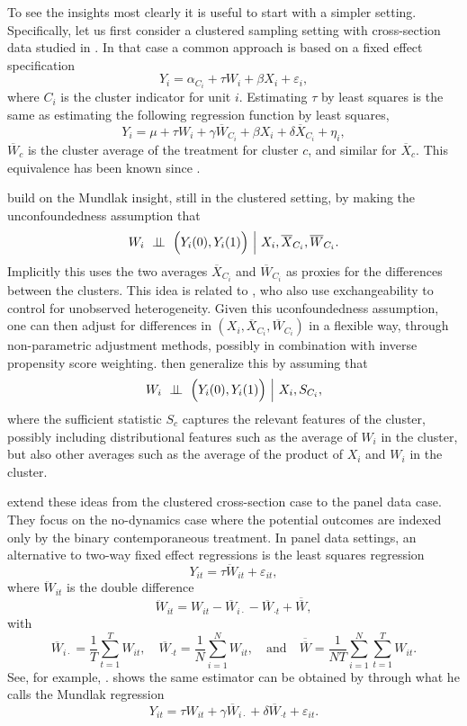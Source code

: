 \documentclass[letterpaper,12pt,leqno]{article}
\newcommand{\indep}{\perp\!\!\!\perp}
\begin{document}
To see the insights most clearly it is useful to start with a simpler setting. Specifically, let us first consider a clustered sampling setting with cross-section data studied in \citep*{arkhangelsky2018role}. In that case a common approach is based on a fixed effect specification
\[ Y_i=\alpha_{C_i}+\tau W_i+\beta X_i+\varepsilon_i,\]
where $C_i$ is the cluster indicator for unit $i$.
Estimating $\tau$ by least squares is the same as estimating the following regression function by least squares,
\[ Y_i=\mu+\tau W_i+\gamma \overline{W}_{C_i}+\beta X_i+\delta \overline{X}_{C_i}+\eta_i,\]
 $\overline{W}_c$ is the cluster average of the treatment for cluster $c$, and similar for $\overline{X}_c$. This equivalence has been known since \citep*{mundlak1978pooling}.




\citep*{arkhangelsky2018role} build on the Mundlak insight, still in the clustered setting, by making the unconfoundedness assumption that 
\[ W_i\ \indep\ \Bigl(Y_i(0),Y_i(1)\Bigr)\ \Bigl|\ X_i,\overline{X}_{C_i},\overline{W}_{C_i}.\]
Implicitly this uses the two averages $\overline{X}_{C_i}$ and $\overline{W}_{C_i}$ as proxies for the differences between the clusters. This idea is related to \citep{altonji2005cross}, who also use exchangeability to control for unobserved heterogeneity. 
Given this uconfoundedness assumption, one can then adjust for differences in  $( X_i,\overline{X}_{C_i},\overline{W}_{C_i})$ in a flexible way, through non-parametric adjustment methods, possibly in combination with inverse propensity score weighting. 
\citep*{arkhangelsky2018role} then generalize this by assuming that 
\[ W_i\ \indep\ \Bigl(Y_i(0),Y_i(1)\Bigr)\ \Bigl|\ X_i,S_{C_i},\]
where the sufficient statistic $S_c$ captures the relevant features of the cluster, possibly including distributional features such as the average of $W_i$ in the cluster, but also other averages such as the average of the product of $X_i$ and $W_i$ in the cluster.

\citep*{arkhangelsky2022doubly} extend these ideas from the clustered cross-section case to the panel data case. They focus on the no-dynamics case where the potential outcomes are indexed only by the binary contemporaneous treatment.
In panel data settings, an alternative to two-way fixed effect regressions is the least squares regression 
\[ Y_{it}=\tau \ddot{W}_{it}+\varepsilon_{it},\]
where $\ddot{W}_{it}$ is the double difference
\[ \ddot{W}_{it}=W_{it}-\overline{W}_{i\cdot}-\overline{W}_{\cdot t}+\overline{\overline{W}},\]
with 
\[\overline{W}_{i\cdot}=\frac{1}{T}\sum_{t=1}^T W_{it},\quad
\overline{W}_{\cdot t}=\frac{1}{N}\sum_{i=1}^N W_{it},\quad \mathrm{and}\quad 
\overline{\overline{W}}=\frac{1}{NT}\sum_{i=1}^N\sum_{t=1}^T   W_{it}.
\]
See, for example, 
\citep{vogelsang2012heteroskedasticity}.
\citep{wooldridge2021two} shows the same estimator can be obtained by through what he calls the Mundlak regression
\[ Y_{it}=\tau {W}_{it}+\gamma \overline{W}_{i\cdot}+
\delta\overline{W}_{\cdot t}+ \varepsilon_{it}.\]
\end{document}
